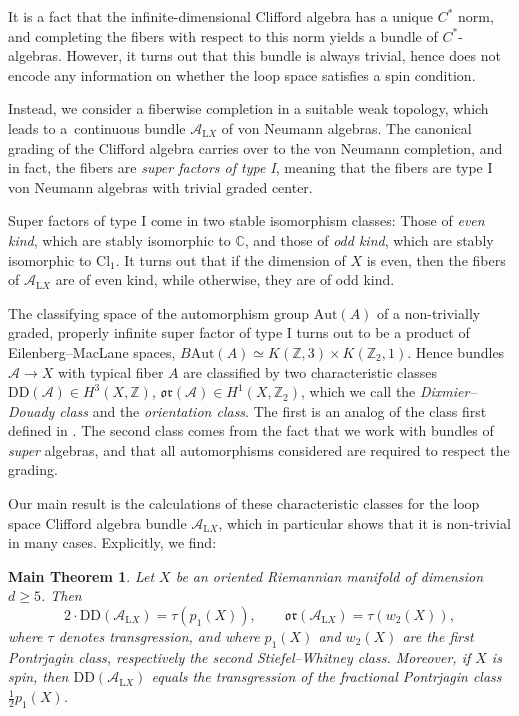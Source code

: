 \documentclass[pdftex]{sigma}
\numberwithin{equation}{section}
\newtheorem{Maintheorem}[Theorem]{Main Theorem}
 { \theoremstyle{definition}
\newtheorem{Definition}[Theorem]{Definition}
\newtheorem{Note}[Theorem]{Note}
\newtheorem{Example}[Theorem]{Example}
\newtheorem{Remark}[Theorem]{Remark} }
\newcommand{\Z}{\mathbb{Z}}
\newcommand{\C}{\mathbb{C}}
\newcommand{\Cl}{\mathrm{Cl}}
\newcommand{\Aut}{\mathrm{Aut}}
\renewcommand{\L}{\mathrm{L}}
\newcommand{\DD}{\mathrm{DD}}
\newcommand{\oclass}{\mathfrak{or}}
\begin{document}
It is a fact that the infinite-dimensional Clifford algebra has a unique $C^*$ norm, and completing the fibers with respect to this norm yields a bundle of $C^*$-algebras.
However, it turns out that this bundle is always trivial, hence does not encode any information on whether the loop space satisfies a spin condition.

Instead, we consider a fiberwise completion in a suitable weak topology, which leads to a~continuous bundle $\mathcal{A}_{\L X}$ of von Neumann algebras.
The canonical grading of the Clifford algebra carries over to the von Neumann completion, and in fact, the fibers are \emph{super factors of type I}, meaning that the fibers are type I von Neumann algebras with trivial graded center.

Super factors of type I come in two stable isomorphism classes:
Those of \emph{even kind}, which are stably isomorphic to $\C$, and those of \emph{odd kind}, which are stably isomorphic to $\Cl_1$.
It turns out that if the dimension of $X$ is even, then the fibers of $\mathcal{A}_{\L X}$ are of even kind, while otherwise, they are of odd kind.

The classifying space of the automorphism group $\Aut(A)$ of a non-trivially graded, properly infinite super factor of type I turns out to be a product of Eilenberg--MacLane spaces, $B\Aut(A) \simeq K(\Z, 3) \times K(\Z_2, 1)$.
Hence bundles $\mathcal{A} \to X$ with typical fiber $A$ are classified by two characteristic classes
$
\DD(\mathcal{A}) \in H^3(X, \Z)$, $\oclass(\mathcal{A}) \in H^1(X, \Z_2)$,
which we call the \emph{Dixmier--Douady class} and the \emph{orientation class}.
The first is an analog of the class first defined in \cite{DixmierDouady}.
The second class comes from the fact that we work with bundles of \emph{super} algebras, and that all automorphisms considered are required to respect the grading.

Our main result is the calculations of these characteristic classes for the loop space Clifford algebra bundle $\mathcal{A}_{\L X}$, which in particular shows that it is non-trivial in many cases.
Explicitly, we find:

\begin{Maintheorem} \label{ThmObstructionClass}
Let $X$ be an oriented Riemannian manifold of dimension $d\geq 5$.
Then
\begin{equation*}
2\cdot \mathrm{DD}(\mathcal{A}_{\L X}) = \tau(p_1(X)),\qquad \oclass(\mathcal{A}_{\L X}) = \tau(w_2(X)),
\end{equation*}
where $\tau$ denotes transgression, and where $p_1(X)$ and $w_2(X)$ are the first Pontrjagin class, respectively the second Stiefel--Whitney class.
Moreover, if $X$ is spin, then $\mathrm{DD}(\mathcal{A}_{\L X})$ equals the transgression of the fractional Pontrjagin class $\frac{1}{2}p_1(X)$.
\end{Maintheorem}
\end{document}
